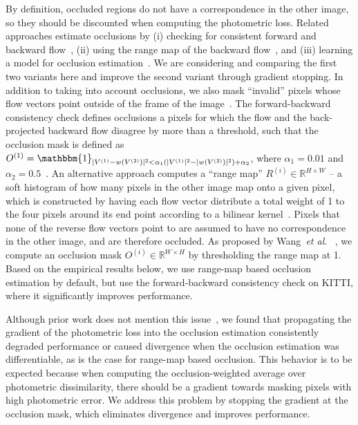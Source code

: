\documentclass[runningheads]{llncs}
\newcommand{\etal}{\textit{et al}. }
\begin{document}
 By definition, occluded regions do not have a correspondence in the other image, so they should be discounted when computing the photometric loss.
Related approaches estimate occlusions by (i) checking for consistent forward and backward flow~\cite{wang2018occlusion}, (ii) using the range map of the backward flow~\cite{Brox04}, and (iii) learning a model for occlusion estimation~\cite{Janai2018ECCV}. We are considering and comparing the first two variants here and improve the second variant through gradient stopping. In addition to taking into account occlusions, we also mask ``invalid'' pixels whose flow vectors point outside of the frame of the image~\cite{wang2018occlusion}.
The forward-backward consistency check defines occlusions a pixels for which the flow and the back-projected backward flow disagree by more than a threshold, such that the occlusion mask is defined as $O^{(1)} = \mathbbm{1}_{|V^{(1)} - w(V^{(2)})|^2 < \alpha_1(|V^{(1)}|^2 - |w(V^{(2)})|^2) + \alpha_2}$, where $\alpha_1=0.01$ and $\alpha_2=0.5$~\cite{sundaram2010dense}. An alternative approach computes a ``range map'' $R^{(i)} \in \mathbb{R}^{H \times W}$ -- a soft histogram of how many pixels in the other image map onto a given pixel, which is constructed by having each flow vector distribute a total weight of 1 to the four pixels around its end point according to a bilinear kernel~\cite{wang2018occlusion}. Pixels that none of the reverse flow vectors point to are assumed to have no correspondence in the other image, and are therefore occluded. As proposed by Wang~\etal~\cite{wang2018occlusion}, we compute an occlusion mask $O^{(i)}\in\mathbb{R}^{W \times H}$ by thresholding the range map at 1. Based on the empirical results below, we use range-map based occlusion estimation by default, but use the forward-backward consistency check on KITTI, where it significantly improves performance.

 Although prior work does not mention this issue~\cite{wang2018occlusion}, we found that propagating the gradient of the photometric loss into the occlusion estimation consistently degraded performance or caused divergence when the occlusion estimation was differentiable, as is the case for range-map based occlusion. This behavior is to be expected because when computing the occlusion-weighted average over photometric dissimilarity, there should be a gradient towards masking pixels with high photometric error. We address this problem by stopping the gradient at the occlusion mask, which eliminates divergence and improves performance.
\end{document}
